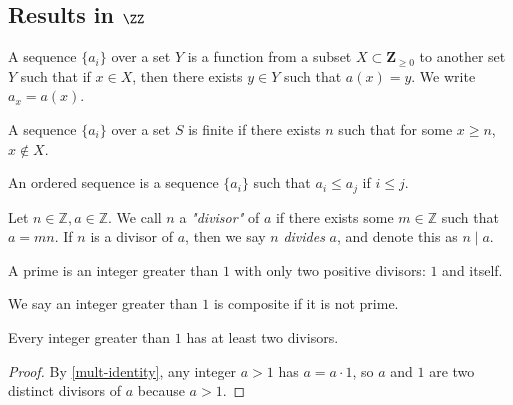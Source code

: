 \subsection{Results in $\ZZ$}

\begin{definition}[Sequences]\label{sequence} A sequence $\{ a_i \}$ over a set $Y$ is a function from a subset $X \subset \mathbf{Z}_{\ge 0}$ to another set $Y$ such that if $x \in X$, then there exists $y \in Y$ such that $a(x) = y$. We write $a_x = a(x)$.
\end{definition}

\begin{definition}\label{finite_sequence} A sequence $\{ a_i \}$ over a set $S$ is finite if there exists $n$ such that for some $x \ge n$, $x \notin X$.
\end{definition}

\begin{definition}\label{ordered_sequence}
    An ordered sequence is a sequence $\{ a_i \}$ such that $a_i\leq a_j$ if $i\leq j$.
\end{definition}

\begin{definition}[Divisor] \label{divisor}
\noindent Let $n \in \mathbb{Z}, a \in \mathbb{Z}$. We call $n$ a \textit{"divisor"} of $a$ if there exists some $m \in \mathbb{Z}$ such that $a = mn$. If $n$ is a divisor of $a$, then we say $n$ \textit{divides} $a$, and denote this as $n \mid a$.
\end{definition}

\begin{definition}[Primes]\label{def_prime}
    A prime is an integer greater than $1$ with only two positive divisors: $1$ and itself. 
\end{definition}

\begin{definition}[Composites]\label{def_composite}
    We say an integer greater than $1$ is composite if it is not prime.
\end{definition}

\begin{lemma}\label{atleast2divisors}
    Every integer greater than $1$ has at least two divisors.
\end{lemma}
\begin{proof}
    By \ref{mult-identity}, any integer $a>1$ has $a=a\cdot 1$, so $a$ and $1$ are two distinct divisors of $a$ because $a>1$.
\end{proof}

